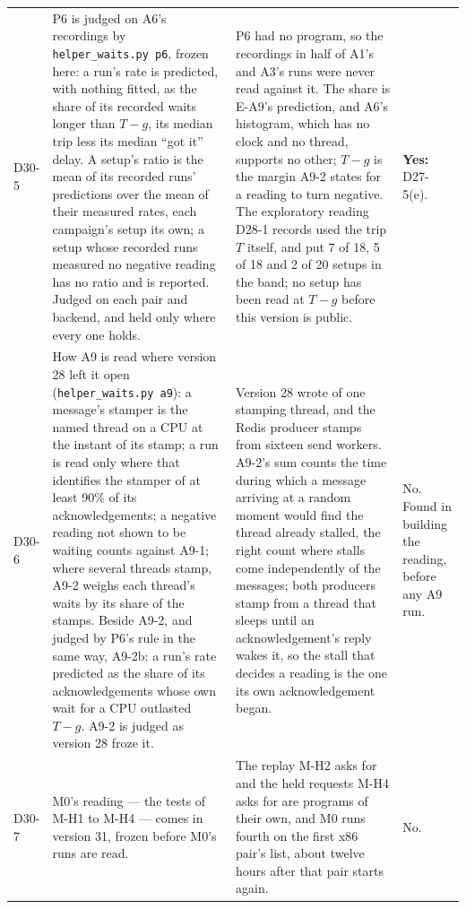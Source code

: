 \documentclass[11pt]{article}
\begin{document}
{\begin{longtable}{@{}p{1.1cm} >{\raggedright\arraybackslash}p{6.1cm} >{\raggedright\arraybackslash}p{6.0cm} >{\raggedright\arraybackslash}p{2.2cm}@{}}
D30-5 & P6 is judged on A6's recordings by \texttt{helper\_waits.py p6}, frozen here: a run's rate is predicted, with nothing fitted, as the share of its recorded waits longer than $T - g$, its median trip less its median ``got it'' delay. A setup's ratio is the mean of its recorded runs' predictions over the mean of their measured rates, each campaign's setup its own; a setup whose recorded runs measured no negative reading has no ratio and is reported. Judged on each pair and backend, and held only where every one holds. & P6 had no program, so the recordings in half of A1's and A3's runs were never read against it. The share is E-A9's prediction, and A6's histogram, which has no clock and no thread, supports no other; $T - g$ is the margin A9-2 states for a reading to turn negative. The exploratory reading D28-1 records used the trip $T$ itself, and put 7 of 18, 5 of 18 and 2 of 20 setups in the band; no setup has been read at $T - g$ before this version is public. & \textbf{Yes:} D27-5(e). \\
D30-6 & How A9 is read where version 28 left it open (\texttt{helper\_waits.py a9}): a message's stamper is the named thread on a CPU at the instant of its stamp; a run is read only where that identifies the stamper of at least 90\% of its acknowledgements; a negative reading not shown to be waiting counts against A9-1; where several threads stamp, A9-2 weighs each thread's waits by its share of the stamps. Beside A9-2, and judged by P6's rule in the same way, A9-2b: a run's rate predicted as the share of its acknowledgements whose own wait for a CPU outlasted $T - g$. A9-2 is judged as version 28 froze it. & Version 28 wrote of one stamping thread, and the Redis producer stamps from sixteen send workers. A9-2's sum counts the time during which a message arriving at a random moment would find the thread already stalled, the right count where stalls come independently of the messages; both producers stamp from a thread that sleeps until an acknowledgement's reply wakes it, so the stall that decides a reading is the one its own acknowledgement began. & No. Found in building the reading, before any A9 run. \\
D30-7 & M0's reading --- the tests of M-H1 to M-H4 --- comes in version 31, frozen before M0's runs are read. & The replay M-H2 asks for and the held requests M-H4 asks for are programs of their own, and M0 runs fourth on the first x86 pair's list, about twelve hours after that pair starts again. & No. \\
\bottomrule
\end{longtable}}
\end{document}
